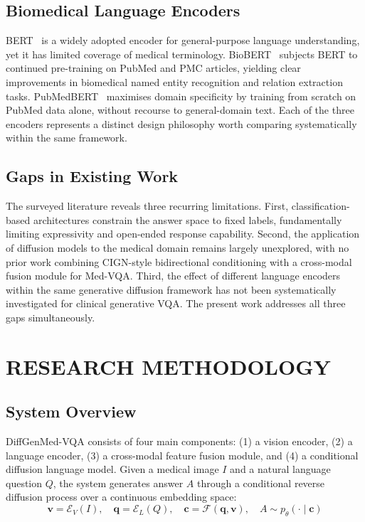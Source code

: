 \documentclass[9pt]{report}
\begin{document}
\section{Biomedical Language Encoders}

BERT~\cite{bert} is a widely adopted encoder for general-purpose language understanding, yet it has limited coverage of medical terminology. BioBERT~\cite{biobert} subjects BERT to continued pre-training on PubMed and PMC articles, yielding clear improvements in biomedical named entity recognition and relation extraction tasks. PubMedBERT~\cite{pubmedbert} maximises domain specificity by training from scratch on PubMed data alone, without recourse to general-domain text. Each of the three encoders represents a distinct design philosophy worth comparing systematically within the same framework.

\section{Gaps in Existing Work}

The surveyed literature reveals three recurring limitations. First, classification-based architectures constrain the answer space to fixed labels, fundamentally limiting expressivity and open-ended response capability. Second, the application of diffusion models to the medical domain remains largely unexplored, with no prior work combining CIGN-style bidirectional conditioning with a cross-modal fusion module for Med-VQA. Third, the effect of different language encoders within the same generative diffusion framework has not been systematically investigated for clinical generative VQA. The present work addresses all three gaps simultaneously.

\chapter{RESEARCH METHODOLOGY}
\label{chap:method}

\section{System Overview}

DiffGenMed-VQA consists of four main components: (1) a vision encoder, (2) a language encoder, (3) a cross-modal feature fusion module, and (4) a conditional diffusion language model. Given a medical image $I$ and a natural language question $Q$, the system generates answer $A$ through a conditional reverse diffusion process over a continuous embedding space:
\begin{equation}
    \mathbf{v} = \mathcal{E}_V(I), \quad \mathbf{q} = \mathcal{E}_L(Q), \quad \mathbf{c} = \mathcal{F}(\mathbf{q}, \mathbf{v}), \quad A \sim p_\theta(\cdot \mid \mathbf{c})
\end{equation}
\end{document}
